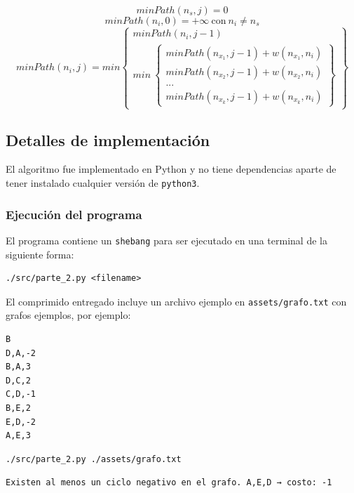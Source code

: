 \documentclass[titlepage,a4paper]{article}
\begin{document}
$$minPath(n_s, j) = 0$$
$$minPath(n_i, 0) = +\infty\ \text{con}\ n_i \neq n_s$$
$$
minPath(n_i, j) = min \left\{\begin{array}{lcc}
                        minPath(n_i, j-1) \\
                        min\ \left\{\begin{array}{lcc}
                               minPath(n_x_1, j-1) + w(n_x_1,n_i) \\
                               minPath(n_x_2, j-1) + w(n_x_2,n_i) \\
                               ... \\
                               minPath(n_x_k, j-1) + w(n_x_k,n_i)
                             \end{array}\right\}
                      \end{array}\right\}
$$

\subsection{Detalles de implementación}
\label{sec:org972db08}

El algoritmo fue implementado en Python y no tiene dependencias aparte de tener
instalado cualquier versión de \texttt{python3}.

\subsubsection{Ejecución del programa}
\label{sec:org51db6ac}

El programa contiene un \texttt{shebang} para ser ejecutado en una terminal de la
siguiente forma:

\begin{verbatim}
./src/parte_2.py <filename>
\end{verbatim}

El comprimido entregado incluye un archivo ejemplo en \texttt{assets/grafo.txt} con grafos ejemplos,
por ejemplo:

\begin{verbatim}
B
D,A,-2
B,A,3
D,C,2
C,D,-1
B,E,2
E,D,-2
A,E,3
\end{verbatim}

\begin{verbatim}
./src/parte_2.py ./assets/grafo.txt
\end{verbatim}

\begin{verbatim}
Existen al menos un ciclo negativo en el grafo. A,E,D → costo: -1
\end{verbatim}
\end{document}
